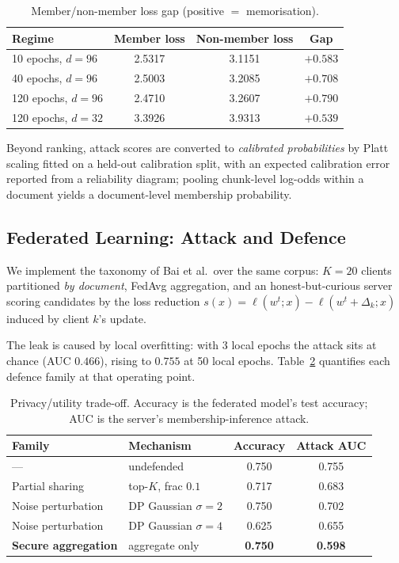 \documentclass[11pt,a4paper]{article}
\theoremstyle{plain}
\theoremstyle{definition}
\begin{document}
\begin{table}[h]
\centering
\caption{Member/non-member loss gap (positive $=$ memorisation).}
\begin{tabular}{lccc}
\toprule
\textbf{Regime} & \textbf{Member loss} & \textbf{Non-member loss} & \textbf{Gap} \\
\midrule
10 epochs, $d=96$   & 2.5317 & 3.1151 & $+0.583$ \\
40 epochs, $d=96$   & 2.5003 & 3.2085 & $+0.708$ \\
120 epochs, $d=96$  & 2.4710 & 3.2607 & $\mathbf{+0.790}$ \\
\midrule
120 epochs, $d=32$  & 3.3926 & 3.9313 & $+0.539$ \\
\bottomrule
\end{tabular}
\label{tab:mia}
\end{table}

Beyond ranking, attack scores are converted to \emph{calibrated
probabilities} by Platt scaling fitted on a held-out calibration split, with
an expected calibration error reported from a reliability diagram; pooling
chunk-level log-odds within a document yields a document-level membership
probability.

\subsection{Federated Learning: Attack and Defence}

We implement the taxonomy of Bai et al.\ over the same corpus: $K=20$ clients
partitioned \emph{by document}, FedAvg aggregation, and an honest-but-curious
server scoring candidates by the loss reduction
$s(x)=\ell(w^{t};x)-\ell(w^{t}+\Delta_k;x)$ induced by client $k$'s update.

The leak is caused by local overfitting: with 3 local epochs the attack sits
at chance (AUC $0.466$), rising to $0.755$ at 50 local epochs.
Table~\ref{tab:fed} quantifies each defence family at that operating point.

\begin{table}[h]
\centering
\caption{Privacy/utility trade-off. Accuracy is the federated model's test
accuracy; AUC is the server's membership-inference attack.}
\begin{tabular}{llcc}
\toprule
\textbf{Family} & \textbf{Mechanism} & \textbf{Accuracy} & \textbf{Attack AUC} \\
\midrule
---                 & undefended            & 0.750 & 0.755 \\
Partial sharing     & top-$K$, frac $0.1$   & 0.717 & 0.683 \\
Noise perturbation  & DP Gaussian $\sigma=2$& 0.750 & 0.702 \\
Noise perturbation  & DP Gaussian $\sigma=4$& 0.625 & 0.655 \\
\textbf{Secure aggregation} & aggregate only & \textbf{0.750} & \textbf{0.598} \\
\bottomrule
\end{tabular}
\label{tab:fed}
\end{table}
\end{document}
